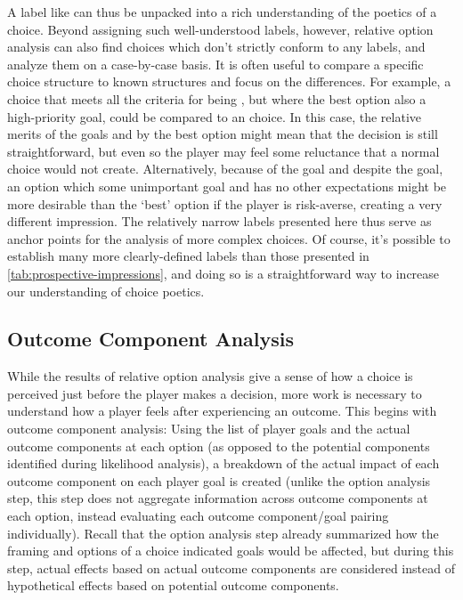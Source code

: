 A label like  can thus be unpacked into a rich understanding of the poetics of a choice.
%
Beyond assigning such well-understood labels, however, relative option analysis can also find choices which don't strictly conform to any labels, and analyze them on a case-by-case basis.
%
It is often useful to compare a specific choice structure to known structures and focus on the differences.
%
For example, a choice that meets all the criteria for being , but where the best option also  a high-priority goal, could be compared to an  choice.
%
In this case, the relative merits of the goals  and  by the best option might mean that the decision is still straightforward, but even so the player may feel some reluctance that a normal  choice would not create.
%
Alternatively, because of the  goal and despite the  goal, an option which  some unimportant goal and has no other expectations might be more desirable than the `best' option if the player is risk-averse, creating a very different impression.
%
The relatively narrow labels presented here thus serve as anchor points for the analysis of more complex choices.
%
Of course, it's possible to establish many more clearly-defined labels than those presented in \cref{tab:prospective-impressions}, and doing so is a straightforward way to increase our understanding of choice poetics.


\subsection{Outcome Component Analysis}

\label{sec:cp-outcome-component-analysis}

While the results of relative option analysis give a sense of how a choice is perceived just before the player makes a decision, more work is necessary to understand how a player feels after experiencing an outcome.
%
This begins with outcome component analysis: Using the list of player goals and the actual outcome components at each option (as opposed to the potential components identified during likelihood analysis), a breakdown of the actual impact of each outcome component on each player goal is created (unlike the option analysis step, this step does not aggregate information across outcome components at each option, instead evaluating each outcome component/goal pairing individually).
%
Recall that the option analysis step already summarized how the framing and options of a choice indicated goals would be affected, but during this step, actual effects based on actual outcome components are considered instead of hypothetical effects based on potential outcome components.


